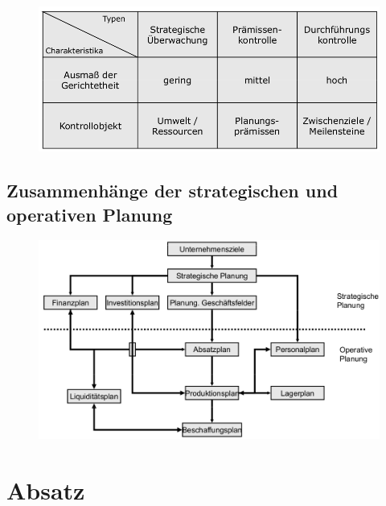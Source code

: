 \documentclass[a4paper,11pt, twoside]{article}
\begin{document}
\begin{figure}[h]
 \begin{center}
   \includegraphics[scale=0.2]{bilder/strategische_kontrolle2.png}
 \end{center}
\end{figure}

\subsection{Zusammenhänge der strategischen und operativen Planung}
\begin{figure}[h]
 \begin{center}
   \includegraphics[scale=0.2]{bilder/zusammenhang_strop.png}
 \end{center}
\end{figure}

\newpage
\section{Absatz}
\end{document}

